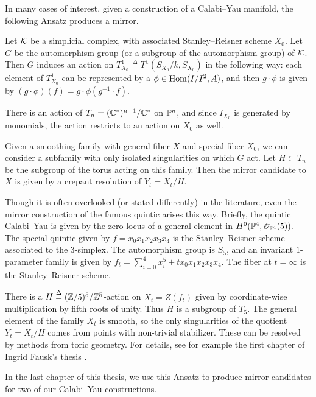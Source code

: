 In many cases of interest, given a construction of a Calabi--Yau manifold, the following Ansatz produces a mirror.

Let $\K$ be a simplicial complex, with associated Stanley--Reisner scheme $X_0$. Let $G$ be the automorphism group (or a subgroup of the automorphism group) of $\K$. Then $G$ induces an action on $T^1_{X_0} \stackrel \Delta = T^1(S_{X_0}/k,S_{X_0})$ in the following way: each element of $T_{X_0}^1$ can be represented by a $\phi \in \Hom(I/I^2,A)$, and then $g \cdot \phi$ is given by $(g \cdot \phi)(f) = g \cdot \phi(g^{-1} \cdot f)$.

There is an action of $T_n=(\C^\ast)^{n+1}/\C^\ast$ on $\P^n$, and since $I_{X_0}$ is generated by monomials, the action restricts to an action on $X_0$ as well.

Given a smoothing family with general fiber $X$ and special fiber $X_0$, we can consider a subfamily with only isolated singularities on which $G$ act.  Let $H \subset T_n$ be the subgroup of the torus acting on this family. Then the mirror candidate to $X$ is given by a crepant resolution of $Y_t=X_t/H$.

Though it is often overlooked (or stated differently) in the literature, even the mirror construction of the famous quintic arises this way. Briefly, the quintic Calabi--Yau is given by the zero locus of a general element in $H^0(\P^4,\OO_{\P^4}(5))$. The special quintic given by $f=x_0x_1x_2x_3x_4$ is the Stanley--Reisner scheme associated to the $3$-simplex. The automorphism group is $S_5$, and an invariant $1$-parameter family is given by $f_t=\sum_{i=0}^4 x_i^5 + t x_0 x_1x_2x_3x_4$. The fiber at $t=\infty$ is the Stanley--Reisner scheme.

There is a $H \stackrel \Delta = (\Z/5)^5/\Z^5$-action on $X_t = Z(f_t)$ given by coordinate-wise multiplication by fifth roots of unity. Thus $H$ is a subgroup of $T_5$. The general element of the family $X_t$ is smooth, so the only singularities of the quotient $Y_t=X_t/H$ comes from points with non-trivial stabilizer. These can be resolved by methods from toric geometry. For details, see for example the first chapter of Ingrid Fausk's thesis \cite{fausk_thesis}.

In the last chapter of this thesis, we use this Ansatz to produce mirror candidates for two of our Calabi--Yau constructions.